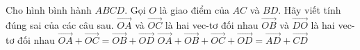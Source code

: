 \begin{ex}%
	Cho hình bình hành $ABCD$. Gọi $O$ là giao điểm của $AC$ và $BD$. Hãy  viết tính đúng sai của các câu sau.
	\choiceTF 
		{\True $\overrightarrow{OA}$ và $\overrightarrow{OC}$ là hai vec-tơ đối  nhau}
		{$\overrightarrow{OB}$ và  $\overrightarrow{DO}$ là hai vec-tơ đối nhau}
		{\True  $\overrightarrow{OA}+\overrightarrow{OC}=\overrightarrow{OB}+\overrightarrow{OD}$}
		 {$\overrightarrow{OA}+\overrightarrow{OB}+\overrightarrow{OC}+\overrightarrow{OD}=\overrightarrow{AD}+\overrightarrow{CD}$}
\end{ex}

